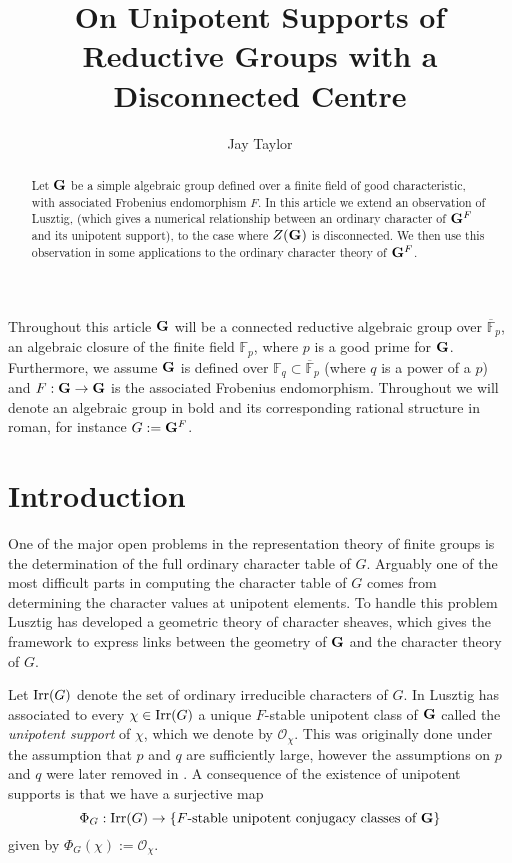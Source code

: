 \documentclass{jt-calcs}
\title{On Unipotent Supports of Reductive Groups with a Disconnected Centre}
\author{Jay Taylor}
\begin{document}
\start
\begin{abstract}
Let $\mathbf{G}$ be a simple algebraic group defined over a finite field of good characteristic, with associated Frobenius endomorphism $F$. In this article we extend an observation of Lusztig, (which gives a numerical relationship between an ordinary character of $\mathbf{G}^F$ and its unipotent support), to the case where $Z(\mathbf{G})$ is disconnected. We then use this observation in some applications to the ordinary character theory of $\mathbf{G}^F$.
\end{abstract}

Throughout this article $\mathbf{G}$ will be a connected reductive algebraic group over $\overline{\mathbb{F}}_p$, an algebraic closure of the finite field $\mathbb{F}_p$, where $p$ is a good prime for $\mathbf{G}$. Furthermore, we assume $\mathbf{G}$ is defined over $\mathbb{F}_q \subset \overline{\mathbb{F}}_p$ (where $q$ is a power of a $p$) and $F:\mathbf{G}\to \mathbf{G}$ is the associated Frobenius endomorphism. Throughout we will denote an algebraic group in bold and its corresponding rational structure in roman, for instance $G := \mathbf{G}^F$.

\section{Introduction}
One of the major open problems in the representation theory of finite groups is the determination of the full ordinary character table of $G$. Arguably one of the most difficult parts in computing the character table of $G$ comes from determining the character values at unipotent elements. To handle this problem Lusztig has developed a geometric theory of character sheaves, which gives the framework to express links between the geometry of $\mathbf{G}$ and the character theory of $G$.

Let $\operatorname{Irr}(G)$ denote the set of ordinary irreducible characters of $G$. In \cite{lusztig:1992:a-unipotent-support} Lusztig has associated to every $\chi \in \operatorname{Irr}(G)$ a unique $F$-stable unipotent class of $\mathbf{G}$ called the \emph{unipotent support} of $\chi$, which we denote by $\mathcal{O}_{\chi}$. This was originally done under the assumption that $p$ and $q$ are sufficiently large, however the assumptions on $p$ and $q$ were later removed in \cite{geck-malle:2000:existence-of-a-unipotent-support}. A consequence of the existence of unipotent supports is that we have a surjective map
\begin{equation*}
\Phi_G : \operatorname{Irr}(G) \to \{F\text{-stable unipotent conjugacy classes of }\mathbf{G}\}
\end{equation*}
given by $\Phi_G(\chi) := \mathcal{O}_{\chi}$.
\end{document}

